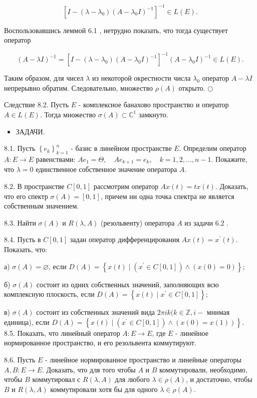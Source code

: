 \[
\left[I-\left(\lambda-\lambda_{0}\right)\left(A-\lambda_{0} I\right)^{-1}\right]^{-1} \in L(E) .
\]

Воспользовавшись леммой 6.1 , нетрудно показать, что тогда существует оператор

\[
(A-\lambda I)^{-1}=\left[I-\left(\lambda-\lambda_{0}\right)\left(A-\lambda_{0} I\right)^{-1}\right]^{-1}\left(A-\lambda_{0} I\right)^{-1} \in L(E) .
\]

Таким образом, для чисел $\lambda$ из некоторой окрестности числа $\lambda_{0}$ оператор $A-\lambda I$ непрерывно обратим. Следовательно, множество $\rho(A)$ открыто. $\bigcirc$

Следствие 8.2. Пусть $E$ - комплексное банахово пространство и оператор $A \in L(E)$. Тогда множество $\sigma(A) \subset \mathbb{C}^{1}$ замкнуто.

\begin{itemize}
  \item ЗАДАЧИ.
\end{itemize}

8.1. Пусть $\left\{e_{k}\right\}_{k=1}^{n}$ - базис в линейном пространстве $E$. Определим оператор $A: E \rightarrow E$ равенствами: $A e_{1}=\Theta, \quad A e_{k+1}=e_{k}, \quad k=1,2, \ldots, n-1$. Покажите, что $\lambda=0$ единственное собственное значение оператора $A$.

8.2. В пространстве $C[0,1]$ рассмотрим оператор $A x(t)=t x(t)$. Доказать, что его спектр $\sigma(A)=[0,1]$, причем ни одна точка спектра не является собственным значением.

8.3. Найти $\sigma(A)$ и $R(\lambda, A)$ (резольвенту) оператора $A$ из задачи 6.2 .

8.4. Пусть в $C[0,1]$ задан оператор дифференцирования $A x(t)=x^{\prime}(t)$. Показать, что:

а) $\sigma(A)=\varnothing$, если $D(A)=\left\{x(t) \mid\left(x^{\prime} \in C[0,1]\right) \wedge(x(0)=0)\right\}$;

б) $\sigma(A)$ состоит из одних собственных значений, заполняющих всю комплексную плоскость, если $D(A)=\left\{x(t) \mid x^{\prime} \in C[0,1]\right\}$;

в) $\sigma(A)$ состоит из собственных значений вида $2 \pi i k(k \in \mathbb{Z}, i-$ мнимая единица), если $D(A)=\left\{x(t) \mid\left(x^{\prime} \in C[0,1]\right) \wedge(x(0)=x(1))\right\}$. 8.5. Показать, что линейный оператор $A: E \rightarrow E$, где $E$ - линейное нормированное пространство, и его резольвента коммутируют.

8.6. Пусть $E$ - линейное нормированное пространство и линейные операторы $A, B: E \rightarrow E$. Доказать, что для того чтобы $A$ и $B$ коммутировали, необходимо, чтобы $B$ коммутировал с $R(\lambda, A)$ для любого $\lambda \in \rho(A)$, и достаточно, чтобы $B$ и $R(\lambda, A)$ коммутировали хотя бы для одного $\lambda \in \rho(A)$.

